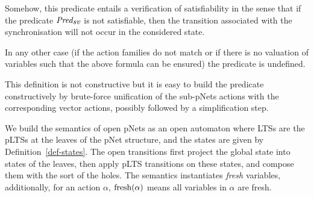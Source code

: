 \documentclass{llncs}
\begin{document}
 

Somehow, this predicate entails a verification of satisfiability in the sense that if the 
predicate $\Pred_{\symb{sv}}$ is not satisfiable, then the transition associated with the 
synchronisation will not occur in the considered state. 


In any other case (if the action families do not match or if there is no valuation of
variables such that the above formula can be ensured) the predicate is undefined.

This definition is not constructive but it is easy to build the predicate constructively
by brute-force unification of the sub-pNets
actions with the corresponding vector actions, possibly followed by a simplification
step.


We build the semantics of open pNets as an open automaton where LTSs are the pLTSs at
the leaves of the pNet structure, and the states are given by 
Definition~\ref{def-states}. The open transitions first
 project the global state into states of the leaves, then apply
pLTS transitions on these states, and compose them with the sort of the holes. %
The semantics    instantiates \emph{fresh} variables, additionally, for an action 
$\alpha$, $\operatorname{fresh}(\alpha)$ means all variables in $\alpha$ are fresh.
\end{document}
